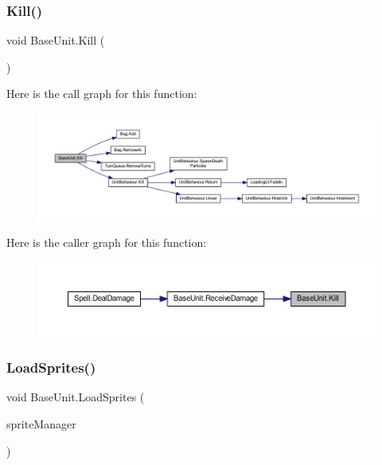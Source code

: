 \subsubsection{\texorpdfstring{Kill()}{Kill()}}
{\footnotesize\ttfamily void Base\+Unit.\+Kill (\begin{DoxyParamCaption}{ }\end{DoxyParamCaption})}

Here is the call graph for this function\+:
\nopagebreak
\begin{figure}[H]
\begin{center}
\leavevmode
\includegraphics[width=350pt]{class_base_unit_ae32912e26fcd7ea4b251045742064af4_cgraph}
\end{center}
\end{figure}
Here is the caller graph for this function\+:
\nopagebreak
\begin{figure}[H]
\begin{center}
\leavevmode
\includegraphics[width=350pt]{class_base_unit_ae32912e26fcd7ea4b251045742064af4_icgraph}
\end{center}
\end{figure}
\mbox{\label{class_base_unit_ab93bf1d3c3ca2899d591a936760d46cf}} 
\subsubsection{\texorpdfstring{LoadSprites()}{LoadSprites()}}
{\footnotesize\ttfamily void Base\+Unit.\+Load\+Sprites (\begin{DoxyParamCaption}\item[{\mbox{\hyperlink{class_sprite_manager}{Sprite\+Manager}}}]{sprite\+Manager }\end{DoxyParamCaption})}

